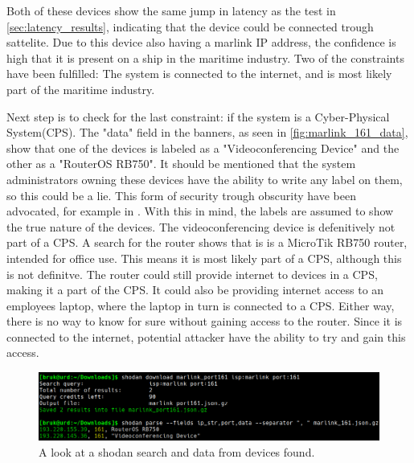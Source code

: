 Both of these devices show the same jump in latency as the test in \cref{sec:latency_results}, indicating that the device could be connected trough sattelite. Due to this device also having a marlink IP address, the confidence is high that it is present on a ship in the maritime industry. Two of the constraints have been fulfilled: The system is connected to the internet, and is most likely part of the maritime industry. 

Next step is to check for the last constraint: if the system is a Cyber-Physical System(CPS). The "data" field in the banners, as seen in \cref{fig:marlink_161_data}, show that one of the devices is labeled as a "Videoconferencing Device" and the other as a "RouterOS RB750". It should be mentioned that the system administrators owning these devices have the ability to write any label on them, so this could be a lie. This form of security trough obscurity have been advocated, for example in \cite{bodenheim_butts_dunlap_mullins_2014}. With this in mind, the labels are assumed to show the true nature of the devices. 
The videoconferencing device is defenitively not part of a CPS. 
A search for the router shows that is is a MicroTik RB750 router, intended for office use.\cite{RB750} This means it is most likely part of a CPS, although this is not definitve. The router could still provide internet to devices in a CPS, making it a part of the CPS. It could also be providing internet access to an employees laptop, where the laptop in turn is connected to a CPS. Either way, there is no way to know for sure without gaining access to the router. Since it is connected to the internet, potential attacker have the ability to try and gain this access.

\begin{figure} [H]
    \centering
    \includegraphics[scale=0.4]{Figurer/marlink_161_data.png}
    \caption{A look at a shodan search and data from devices found.}
    \label{fig:marlink_traceroute_data}
\end{figure}

